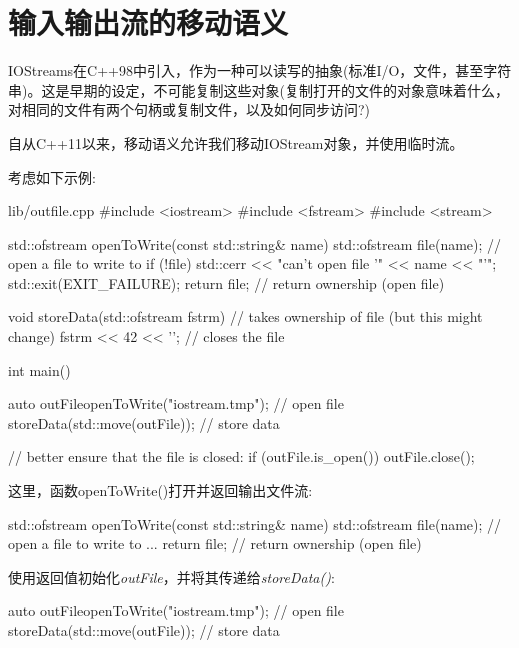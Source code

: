 \section{输入输出流的移动语义}

IOStreams在C++98中引入，作为一种可以读写的抽象(标准I/O，文件，甚至字符串)。这是早期的设定，不可能复制这些对象(复制打开的文件的对象意味着什么，对相同的文件有两个句柄或复制文件，以及如何同步访问?)\par

自从C++11以来，移动语义允许我们移动IOStream对象，并使用临时流。\par


考虑如下示例:\par

\begin{codeboxt}[cpp]{lib/outfile.cpp}
#include <iostream>
#include <fstream>
#include <stream>

std::ofstream openToWrite(const std::string& name)
{
  std::ofstream file(name); // open a file to write to
  if (!file) {
    std::cerr << "can't open file '" << name << "'\n";
    std::exit(EXIT_FAILURE);
  }
  return file; // return ownership (open file)
}

void storeData(std::ofstream fstrm) // takes ownership of file (but this might change)
{
  fstrm << 42 << '\n';
} // closes the file

int main()
{
  auto outFile{openToWrite("iostream.tmp")}; // open file
  storeData(std::move(outFile)); // store data

  // better ensure that the file is closed:
  if (outFile.is_open()) {
    outFile.close();
  }
}
\end{codeboxt}

这里，函数openToWrite()打开并返回输出文件流:\par

\begin{codebox}[cpp]
std::ofstream openToWrite(const std::string& name)
{
  std::ofstream file(name); // open a file to write to
  ...
  return file; // return ownership (open file)
}
\end{codebox}

使用返回值初始化\textit{outFile}，并将其传递给\textit{storeData()}:\par

\begin{codebox}[cpp]
auto outFile{openToWrite("iostream.tmp")}; // open file
storeData(std::move(outFile)); // store data
\end{codebox}

